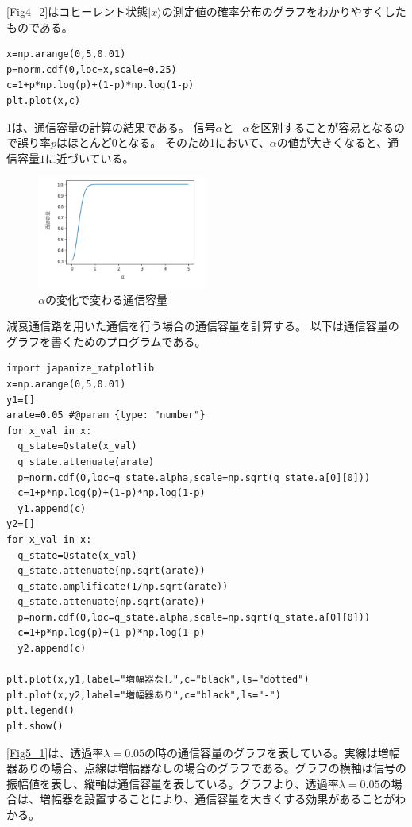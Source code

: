 \documentclass[a4j,twocolumn]{jarticle}
\def \figref #1{\figurename\ref{#1}}
\begin{document}
\figref{Fig4_2}はコヒーレント状態$|x\rangle$の測定値の確率分布のグラフをわかりやすくしたものである。


\begin{lstlisting}[caption=αの変化で変わる通信容量]
x=np.arange(0,5,0.01)
p=norm.cdf(0,loc=x,scale=0.25)
c=1+p*np.log(p)+(1-p)*np.log(1-p)
plt.plot(x,c)
\end{lstlisting}
\figref{Fig4_3}は、通信容量の計算の結果である。
信号$\alpha$と$-\alpha$を区別することが容易となるので誤り率$p$はほとんど$0$となる。
そのため\figref{Fig4_3}において、$\alpha$の値が大きくなると、通信容量$1$に近づいている。

  \begin{figure}[H]     
  \centering   
  \includegraphics[width=0.5\textwidth]{img/Fig5.png}
\caption[sample image (png)]{$\alpha$の変化で変わる通信容量}     \label{Fig4_3}
\end{figure}

減衰通信路を用いた通信を行う場合の通信容量を計算する。
以下は通信容量のグラフを書くためのプログラムである。
\begin{lstlisting}[caption=減衰通信路の通信容量,label=program5_1]
import japanize_matplotlib
x=np.arange(0,5,0.01)
y1=[]
arate=0.05 #@param {type: "number"}
for x_val in x:
  q_state=Qstate(x_val)
  q_state.attenuate(arate)
  p=norm.cdf(0,loc=q_state.alpha,scale=np.sqrt(q_state.a[0][0]))
  c=1+p*np.log(p)+(1-p)*np.log(1-p)
  y1.append(c)
y2=[]
for x_val in x:
  q_state=Qstate(x_val)
  q_state.attenuate(np.sqrt(arate))
  q_state.amplificate(1/np.sqrt(arate))
  q_state.attenuate(np.sqrt(arate))
  p=norm.cdf(0,loc=q_state.alpha,scale=np.sqrt(q_state.a[0][0]))
  c=1+p*np.log(p)+(1-p)*np.log(1-p)
  y2.append(c)

plt.plot(x,y1,label="増幅器なし",c="black",ls="dotted")
plt.plot(x,y2,label="増幅器あり",c="black",ls="-")
plt.legend()
plt.show()
\end{lstlisting}

\figref{Fig5_1}は、透過率$\lambda=0.05$の時の通信容量のグラフを表している。実線は増幅器ありの場合、点線は増幅器なしの場合のグラフである。グラフの横軸は信号の振幅値を表し、縦軸は通信容量を表している。グラフより、透過率$\lambda=0.05$の場合は、増幅器を設置することにより、通信容量を大きくする効果があることがわかる。
\end{document}

